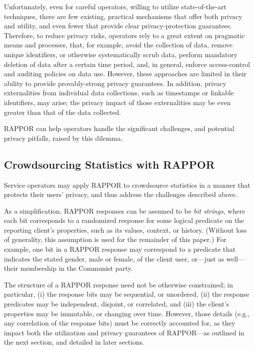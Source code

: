 \documentclass{sig-alternate-2013}
\newcommand\RAPPOR{{RAPPOR}}
\begin{document}
Unfortunately,
even for careful operators, 
willing to utilize state-of-the-art techniques,
there are few existing, practical mechanisms 
that offer both privacy and utility,
and even fewer that provide clear privacy-protection guarantees.
Therefore, 
to reduce privacy risks,
operators rely to a great extent on pragmatic means and processes,
that, for example, avoid the collection of data, 
remove unique identifiers, or otherwise systematically scrub data, 
perform mandatory deletion of data after a certain time period, 
and, in general, enforce access-control and auditing policies on data use.
However, these approaches are limited in their ability to provide provably-strong privacy guarantees. 
In addition, privacy externalities from individual data collections, 
such as timestamps or linkable identifiers, may arise;
the privacy impact of those externalities may
be even greater than that of the data collected.


\RAPPOR{} can help operators
handle the significant challenges, and potential privacy pitfalls,
raised by this dilemma.


\subsection{Crowdsourcing Statistics with \RAPPOR{}}
Service operators may apply \RAPPOR{}
to crowdsource statistics
in a manner that protects their users' privacy,
and thus address the challenges described above.


As a simplification,
\RAPPOR{} responses can be assumed to be \emph{bit strings},
where each bit corresponds to a randomized response 
for some logical predicate on the reporting client's properties, such as its values, context, or history.
(Without loss of generality,
this assumption
is used for the remainder of this paper.)
For example, one bit in a \RAPPOR{} response may correspond to a predicate 
that indicates the stated gender, male or female, of the client user,
or---just as well---their membership in the Communist party.


The structure of a \RAPPOR{} response need not be otherwise constrained;
in particular, 
(i) the response bits may be sequential, or unordered,
(ii) the response predicates may be independent, disjoint, or correlated,
and (iii) the client's properties may be immutable, or changing over time.
However,
those details (e.g., any correlation of the response bits)
must be correctly accounted for,
as they impact both the utilization and privacy guarantees of \RAPPOR{}---as
outlined in the next section, and detailed in later sections.
\end{document}
